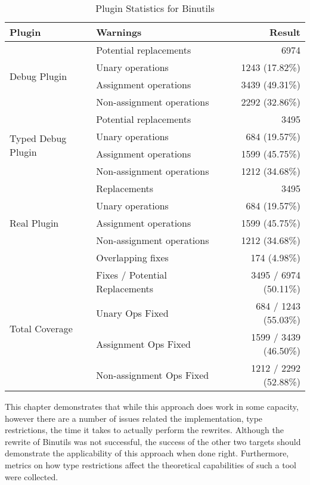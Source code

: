 \begin{table}[ht]
\centering
\caption{Plugin Statistics for Binutils}
\label{tab:binutils}
\begin{tabular}{@{}llr@{}}
\toprule
\textbf{Plugin} & \textbf{Warnings} & \textbf{Result} \\
\midrule

\multirow{4}{*}{Debug Plugin} 
  & Potential replacements         & 6974 \\
  & Unary operations               & 1243 (17.82\%) \\
  & Assignment operations          & 3439 (49.31\%) \\
  & Non-assignment operations      & 2292 (32.86\%) \\
\midrule

\multirow{4}{*}{Typed Debug Plugin} 
  & Potential replacements         & 3495 \\
  & Unary operations               & 684 (19.57\%) \\
  & Assignment operations          & 1599 (45.75\%) \\
  & Non-assignment operations      & 1212 (34.68\%) \\
\midrule

\multirow{5}{*}{Real Plugin} 
  & Replacements                   & 3495 \\
  & Unary operations               & 684 (19.57\%) \\
  & Assignment operations          & 1599 (45.75\%) \\
  & Non-assignment operations      & 1212 (34.68\%) \\
  & Overlapping fixes              & 174 (4.98\%) \\
\midrule\midrule

\multirow{4}{*}{Total Coverage} 
  & Fixes / Potential Replacements & 3495 / 6974 (50.11\%) \\
  & Unary Ops Fixed                & 684 / 1243 (55.03\%) \\
  & Assignment Ops Fixed           & 1599 / 3439 (46.50\%) \\
  & Non-assignment Ops Fixed       & 1212 / 2292 (52.88\%) \\
\bottomrule
\end{tabular}
\end{table}

This chapter demonstrates that while this approach does work in some capacity, however there are a number of issues related the implementation, type restrictions, the time it takes to actually perform the rewrites. Although the rewrite of Binutils was not successful, the success of the other two targets should demonstrate the applicability of this approach when done right. Furthermore, metrics on how type restrictions affect the theoretical capabilities of such a tool were collected.